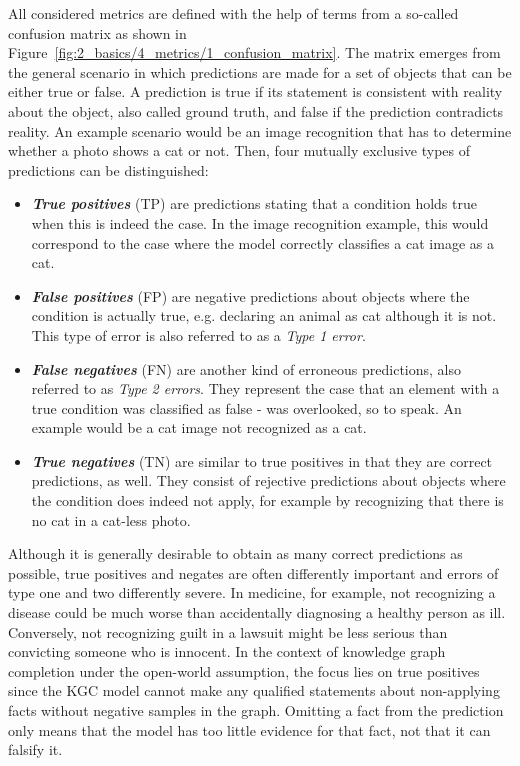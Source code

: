 All considered metrics are defined with the help of terms from a so-called confusion matrix as shown in Figure~\ref{fig:2_basics/4_metrics/1_confusion_matrix}. The matrix emerges from the general scenario in which predictions are made for a set of objects that can be either true or false. A prediction is true if its statement is consistent with reality about the object, also called ground truth, and false if the prediction contradicts reality. An example scenario would be an image recognition that has to determine whether a photo shows a cat or not. Then, four mutually exclusive types of predictions can be distinguished:

\begin{itemize}
    \item \textbf{\emph{True positives}} (TP) are predictions stating that a condition holds true when this is indeed the case. In the image recognition example, this would correspond to the case where the model correctly classifies a cat image as a cat.

    \item \textbf{\emph{False positives}} (FP) are negative predictions about objects where the condition is actually true, e.g. declaring an animal as cat although it is not. This type of error is also referred to as a \emph{Type 1 error}.

    \item \textbf{\emph{False negatives}} (FN) are another kind of erroneous predictions, also referred to as \emph{Type 2 errors}. They represent the case that an element with a true condition was classified as false - was overlooked, so to speak. An example would be a cat image not recognized as a cat.

    \item \textbf{\emph{True negatives}} (TN) are similar to true positives in that they are correct predictions, as well. They consist of rejective predictions about objects where the condition does indeed not apply, for example by recognizing that there is no cat in a cat-less photo.
\end{itemize}

Although it is generally desirable to obtain as many correct predictions as possible, true positives and negates are often differently important and errors of type one and two differently severe. In medicine, for example, not recognizing a disease could be much worse than accidentally diagnosing a healthy person as ill. Conversely, not recognizing guilt in a lawsuit might be less serious than convicting someone who is innocent. In the context of knowledge graph completion under the open-world assumption, the focus lies on true positives since the KGC model cannot make any qualified statements about non-applying facts without negative samples in the graph. Omitting a fact from the prediction only means that the model has too little evidence for that fact, not that it can falsify it.

